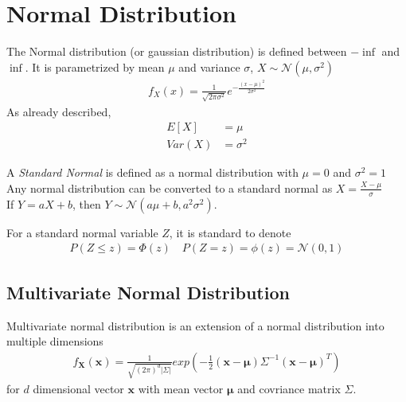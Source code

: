 \documentclass[../../probability-notes.tex]{subfiles}
\begin{document}
    \section{Normal Distribution}
    The Normal distribution (or gaussian distribution) is defined between $-\inf$ and $\inf$. It is parametrized by mean $\mu$ and variance $\sigma$, $X \sim \mathcal{N}(\mu, \sigma^{2})$
    \begin{align*}
        f_{X}(x) = \frac{1}{\sqrt{2\pi \sigma^{2}}} e^{-\frac{(x-\mu)^{2}}{2 \sigma^{2}}}
    \end{align*}
    As already described,
    \begin{align*}
        E[X] &= \mu\\
        Var(X) &= \sigma^{2}
    \end{align*}

    A \emph{Standard Normal} is defined as a normal distribution with $\mu = 0$ and $\sigma^{2} = 1$\\
    Any normal distribution can be converted to a standard normal as $X = \frac{X - \mu}{\sigma}$\\
    If $Y = aX + b$, then $Y \sim \mathcal{N}(a \mu + b, a^{2}\sigma^{2})$.\newline

    For a standard normal variable $Z$, it is standard to denote
    \begin{align*}
        P(Z \leq z) = \Phi(z) \quad P(Z = z) = \phi(z) = \mathcal{N}(0,1)
    \end{align*}

    \subsection{Multivariate Normal Distribution}
    Multivariate normal distribution is an extension of a normal distribution into multiple dimensions
    \begin{align*}
        f_{\mathbf{X}}(\bm{x}) = \frac{1}{\sqrt{(2\pi)^{d} \lvert \Sigma \rvert}} exp(-\frac{1}{2}(\mathbf{x} - \bm{\mu})\Sigma^{-1}(\mathbf{x} - \bm{\mu})^{T})
    \end{align*}
    for $d$ dimensional vector $\mathbf{x}$ with mean vector $\bm{\mu}$ and covriance matrix $\Sigma$.
\end{document}
